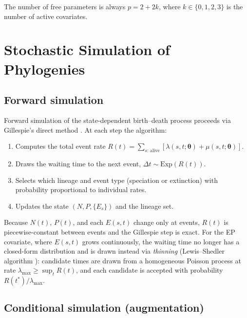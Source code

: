 \documentclass[12pt,a4paper]{article}
\newcommand{\pars}{\bm{\theta}}
\begin{document}
The number of free parameters is always $p = 2 + 2k$, where $k\in\{0,1,2,3\}$
is the number of active covariates.

\section{Stochastic Simulation of Phylogenies}\label{sec:sim}

\subsection{Forward simulation}

Forward simulation of the state-dependent birth--death process proceeds via
Gillespie's direct method \citep{gillespie1977exact}. At each step the
algorithm:
\begin{enumerate}
  \item Computes the total event rate
    $R(t) = \sum_{s:\,\text{alive}} [\lambda(s,t;\pars) + \mu(s,t;\pars)]$.
  \item Draws the waiting time to the next event,
    $\Delta t \sim \mathrm{Exp}(R(t))$.
  \item Selects which lineage and event type (speciation or extinction)
    with probability proportional to individual rates.
  \item Updates the state $(N, P, \{E_s\})$ and the lineage set.
\end{enumerate}
Because $N(t)$, $P(t)$, and each $E(s,t)$ change only at events, $R(t)$
is piecewise-constant between events and the Gillespie step is exact.
For the EP covariate, where $E(s,t)$ grows continuously, the waiting time
no longer has a closed-form distribution and is drawn instead via
\emph{thinning} (Lewis--Shedler algorithm
\citep{lewis1979simulation}): candidate times are drawn from a
homogeneous Poisson process at rate $\lambda_{\max} \geq \sup_t R(t)$, and
each candidate is accepted with probability $R(t^*)/\lambda_{\max}$.

\subsection{Conditional simulation (augmentation)}\label{sec:proposal}
\end{document}
